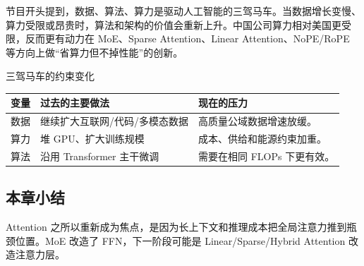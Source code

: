 节目开头提到，数据、算法、算力是驱动人工智能的三驾马车。当数据增长变慢、算力受限或昂贵时，算法和架构的价值会重新上升。中国公司算力相对美国更受限，反而更有动力在 MoE、Sparse Attention、Linear Attention、NoPE/RoPE 等方向上做“省算力但不掉性能”的创新。

\begin{knowledgebox}{三驾马车的约束变化}
\begin{tabularx}{\textwidth}{p{}p{}X}
\toprule
变量 & 过去的主要做法 & 现在的压力 \\
\midrule
数据 & 继续扩大互联网/代码/多模态数据 & 高质量公域数据增速放缓。 \\
算力 & 堆 GPU、扩大训练规模 & 成本、供给和能源约束加重。 \\
算法 & 沿用 Transformer 主干微调 & 需要在相同 FLOPs 下更有效。 \\
\bottomrule
\end{tabularx}
\end{knowledgebox}

\subsection{本章小结}

Attention 之所以重新成为焦点，是因为长上下文和推理成本把全局注意力推到瓶颈位置。MoE 改造了 FFN，下一阶段可能是 Linear/Sparse/Hybrid Attention 改造注意力层。

